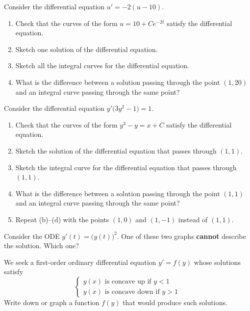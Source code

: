 \begin{exercises}
\begin{problist}
	
	
	\prob Consider the differential equation $u' = -2(u-10)$.
	
	\begin{enumerate}
		\item Check that the curves of the form $u = 10 + C e^{-2t}$ satisfy the differential equation.
		\item Sketch one solution of the differential equation.
		\item Sketch all the integral curves for the differential equation.
		\item What is the difference between a solution passing through the point $(1,20)$ and an integral curve passing through the same point?
	\end{enumerate}


	\prob Consider the differential equation $y'\big( 3y^2-1\big) = 1$.
	
	\begin{enumerate}
		\item Check that the curves of the form $y^3-y=x+C$ satisfy the differential equation.
		\item Sketch the solution of the differential equation that passes through $(1,1)$.
		\item Sketch the integral curve for the differential equation that passes through $(1,1)$.
		\item What is the difference between a solution passing through the point $(1,1)$ and an integral curve passing through the same point?
		\item Repeat (b)--(d) with the points $(1,0)$ and $(1,-1)$ instead of $(1,1)$.
	\end{enumerate}


	\prob Consider the ODE $y'(t) = \big(y(t)\big)^2$.
	One of these two graphs {\bf cannot} describe the solution. 
	Which one? 
	
	
	\begin{center}
	\hfil
	\end{center}

	\prob We seek a first-order ordinary differential equation \quad $y' = f(y)$ \quad whose solutions satisfy
	$$
	\begin{cases}
	y(x)  \mbox{ is concave up if } y < 1 \\
	y(x) \mbox{ is concave down if } y > 1
	\end{cases}
	$$
	Write down or graph a function $f(y)$ that would produce such solutions.

	
	\end{problist}
\end{exercises}
